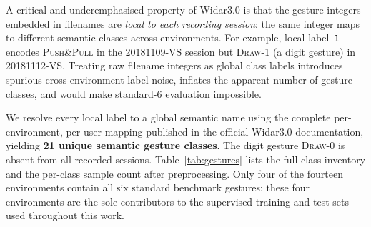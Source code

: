\documentclass[journal]{IEEEtran}
\begin{document}
A critical and underemphasised property of Widar3.0 is that the
gesture integers embedded in filenames are \emph{local to each
recording session}: the same integer maps to different semantic classes
across environments.
For example, local label~\texttt{1} encodes \textsc{Push\&Pull} in
the 20181109-VS session but \textsc{Draw-1} (a digit gesture) in
20181112-VS.
Treating raw filename integers as global class labels introduces
spurious cross-environment label noise, inflates the apparent number
of gesture classes, and would make standard-6 evaluation impossible.

We resolve every local label to a global semantic name using the
complete per-environment, per-user mapping published in the official
Widar3.0 documentation, yielding \textbf{21 unique semantic gesture
classes}.
The digit gesture \textsc{Draw-0} is absent from all recorded
sessions.
Table~\ref{tab:gestures} lists the full class inventory and the
per-class sample count after preprocessing.
Only four of the fourteen environments contain all six standard
benchmark gestures; these four environments are the sole contributors
to the supervised training and test sets used throughout this work.
\end{document}
